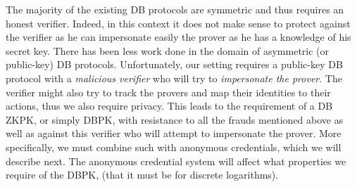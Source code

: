 The majority of the existing \ac{DB} protocols are symmetric and thus requires an honest verifier.
Indeed, in this context it does not make sense to protect against the verifier as he can impersonate easily the prover as he has a knowledge of his secret key.
There has been less work done in the domain of asymmetric (or public-key) \ac{DB} protocols.
Unfortunately, our setting requires a public-key \ac{DB} protocol with a \emph{malicious verifier} who will try to \emph{impersonate the prover}.
The verifier might also try to track the provers and map their identities to their actions, thus we also require privacy.
This leads to the requirement of a \ac{DB} \ac{ZKPK}, or simply \ac{DBPK}, with resistance to all the frauds mentioned above as well as against this verifier 
who will attempt to impersonate the prover.
More specifically, we must combine such  with anonymous credentials, which we will describe next.
The anonymous credential system will affect what properties we require of the \ac{DBPK}, (\eg that it must be  for discrete logarithms).
